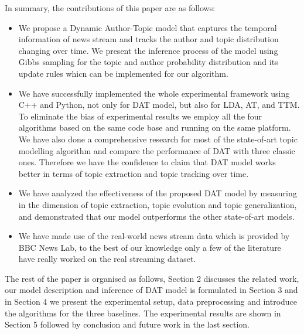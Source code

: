 In summary, the contributions of this paper are as follows:
\begin{itemize}
    \item We propose a Dynamic Author-Topic model that captures the temporal information of news stream and tracks the author and topic distribution changing over time. We present the inference process of the model using Gibbs sampling for the topic and author probability distribution and its update rules whicn can be implemented for our algorithm.
    \item  We have successfully implemented the whole experimental framework using C++ and Python, not only for DAT model, but also for LDA, AT, and TTM. To eliminate the bias of experimental results we employ all the four algorithms based on the same code base and running on the same platform. We have also done a comprehensive research for most of the state-of-art topic modelling algorithm and compare the performance of DAT with three classic ones. Therefore we have the confidence to claim that DAT model works better in terms of topic extraction and topic tracking over time.
    \item We have analyzed the effectiveness of the proposed DAT model by measuring in the dimension of topic extraction, topic evolution and topic generalization, and demonstrated that our model outperforms the other state-of-art models.
    \item We have made use of the real-world news stream data which is provided by BBC News Lab, to the best of our knowledge only a few of the literature have really worked on the real streaming dataset.  
\end{itemize}

The rest of the paper is organised as follows, Section 2 discusses the related work, our model description and inference of DAT model is formulated in Section 3 and in Section 4 we present the experimental setup, data preprocessing and introduce the algorithms for the three baselines. The experimental results are shown in Section 5 followed by conclusion and future work in the last section.

